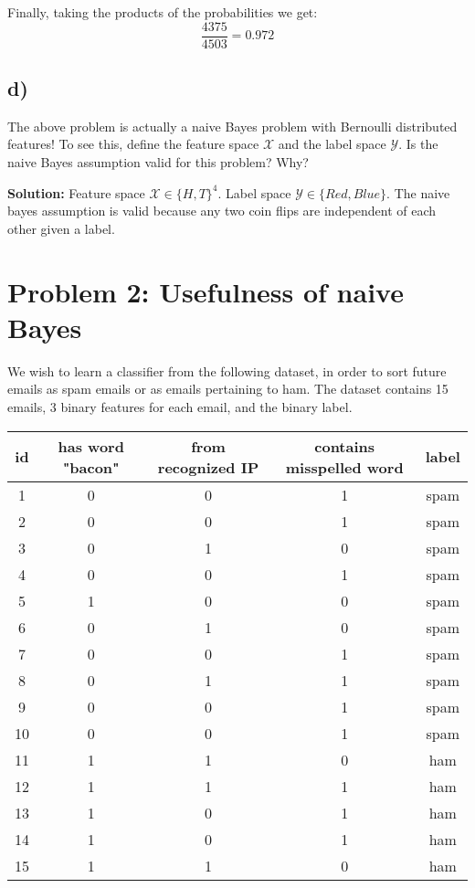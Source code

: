 \documentclass[a4paper]{article}
\begin{document}
Finally, taking the products of the probabilities we get:
$$\frac{4375}{4503} = 0.972$$




\subsection*{d)}
The above problem is actually a naive Bayes problem with Bernoulli distributed features! To see this, define the feature space $\mathcal{X}$ and the label space $\mathcal{Y}$. Is the naive Bayes assumption valid for this problem? Why?

\textbf{Solution:}
Feature space $\mathcal{X} \in \{H,T\}^4$. Label space $\mathcal{Y} \in \{Red, Blue\}$. The naive bayes assumption is valid because any two coin flips are independent of each other given a label. 

\section*{Problem 2: Usefulness of naive Bayes}
We wish to learn a classifier from the following dataset, in order to sort future emails as spam emails or as emails pertaining to ham. The dataset contains 15 emails, 3 binary features for each email, and the binary label.
\begin{center}
\begin{tabular}{ c | c c c | c }
 id & has word "bacon" & from recognized IP & contains misspelled word & label \\ 
 \hline
 1 & 0 & 0 & 1 & spam \\
 2 & 0 & 0 & 1 & spam \\
 3 & 0 & 1 & 0 & spam \\
 4 & 0 & 0 & 1 & spam \\
 5 & 1 & 0 & 0 & spam \\
 6 & 0 & 1 & 0 & spam \\
 7 & 0 & 0 & 1 & spam \\
 8 & 0 & 1 & 1 & spam \\
 9 & 0 & 0 & 1 & spam \\
 10 & 0 & 0 & 1 & spam \\
 11 & 1 & 1 & 0 & ham \\
 12 & 1 & 1 & 1 & ham \\
 13 & 1 & 0 & 1 & ham \\
 14 & 1 & 0 & 1 & ham \\
 15 & 1 & 1 & 0 & ham
\end{tabular}
\end{center}
\end{document}
